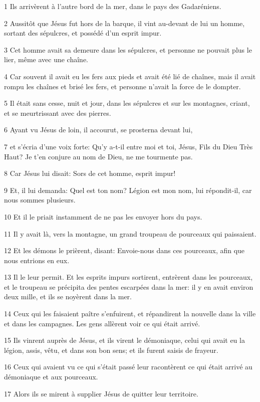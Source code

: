 \par 1 Ils arrivèrent à l'autre bord de la mer, dans le pays des Gadaréniens.
\par 2 Aussitôt que Jésus fut hors de la barque, il vint au-devant de lui un homme, sortant des sépulcres, et possédé d'un esprit impur.
\par 3 Cet homme avait sa demeure dans les sépulcres, et personne ne pouvait plus le lier, même avec une chaîne.
\par 4 Car souvent il avait eu les fers aux pieds et avait été lié de chaînes, mais il avait rompu les chaînes et brisé les fers, et personne n'avait la force de le dompter.
\par 5 Il était sans cesse, nuit et jour, dans les sépulcres et sur les montagnes, criant, et se meurtrissant avec des pierres.
\par 6 Ayant vu Jésus de loin, il accourut, se prosterna devant lui,
\par 7 et s'écria d'une voix forte: Qu'y a-t-il entre moi et toi, Jésus, Fils du Dieu Très Haut? Je t'en conjure au nom de Dieu, ne me tourmente pas.
\par 8 Car Jésus lui disait: Sors de cet homme, esprit impur!
\par 9 Et, il lui demanda: Quel est ton nom? Légion est mon nom, lui répondit-il, car nous sommes plusieurs.
\par 10 Et il le priait instamment de ne pas les envoyer hors du pays.
\par 11 Il y avait là, vers la montagne, un grand troupeau de pourceaux qui paissaient.
\par 12 Et les démons le prièrent, disant: Envoie-nous dans ces pourceaux, afin que nous entrions en eux.
\par 13 Il le leur permit. Et les esprits impurs sortirent, entrèrent dans les pourceaux, et le troupeau se précipita des pentes escarpées dans la mer: il y en avait environ deux mille, et ils se noyèrent dans la mer.
\par 14 Ceux qui les faisaient paître s'enfuirent, et répandirent la nouvelle dans la ville et dans les campagnes. Les gens allèrent voir ce qui était arrivé.
\par 15 Ils vinrent auprès de Jésus, et ils virent le démoniaque, celui qui avait eu la légion, assis, vêtu, et dans son bon sens; et ils furent saisis de frayeur.
\par 16 Ceux qui avaient vu ce qui s'était passé leur racontèrent ce qui était arrivé au démoniaque et aux pourceaux.
\par 17 Alors ils se mirent à supplier Jésus de quitter leur territoire.
